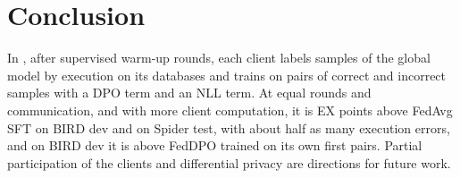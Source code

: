\section{Conclusion}\label{sec:conclusion}

In \method, after supervised warm-up rounds, each client labels samples
of the global model by execution on its databases and trains on pairs of
correct and incorrect samples with a DPO term and an NLL term. At equal
rounds and communication, and with more client computation, it is  EX points
above FedAvg SFT on BIRD dev and  on Spider
test, with about half as many execution errors, and on BIRD dev it is
above FedDPO trained on its own first pairs. Partial participation of
the clients and differential privacy are directions for future work.

